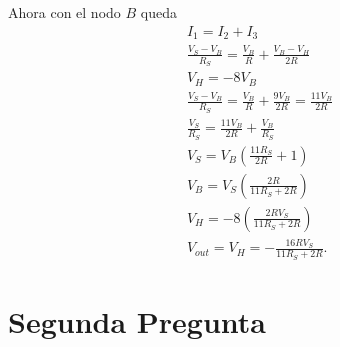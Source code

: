 \documentclass[12pt]{exam}
\begin{document}
Ahora con el nodo $B$ queda
\begin{align*}
  I_1 = I_2 + I_3\\
  \frac{V_S - V_B}{R_S} = \frac{V_B}{R} + \frac{V_B - V_H}{2R}\\
  V_H = -8 V_B\\
  \frac{V_S - V_B}{R_S} = \frac{V_B}{R} + \frac{9V_B}{2R} = \frac{11V_B}{2R}\\
  \frac{V_S}{R_S} = \frac{11V_B}{2R} + \frac{V_B}{R_S}\\
  V_S = V_B\left( \frac{11R_S}{2R} + 1 \right) \\
  V_B = V_S\left( \frac{2R}{11R_S + 2R} \right) \\
  V_H = - 8 \left( \frac{2R V_S}{11R_S + 2R} \right) \\
  V_{out} = V_H = - \frac{16R V_S}{11R_S + 2R}
.\end{align*}

\section*{Segunda Pregunta}
\end{document}
